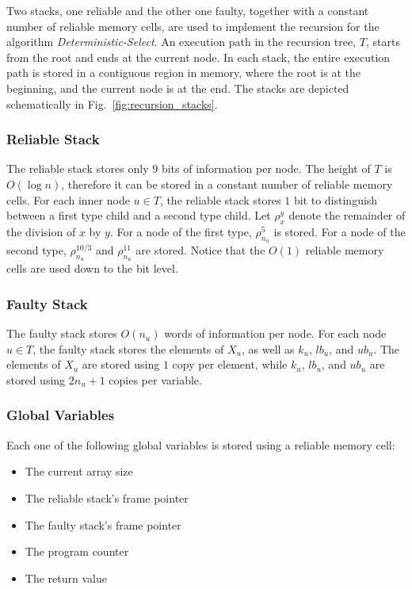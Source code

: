 \documentclass{llncs}
\begin{document}
Two stacks, one reliable and the other one faulty, together with a constant number of reliable memory cells, are used to implement the recursion for the algorithm \emph{Deterministic-Select}. An execution path in the recursion tree, $T$, starts from the root and ends at the current node. In each stack, the entire execution path is stored in a contiguous region in memory, where the root is at the beginning, and the current node is at the end. The stacks are depicted schematically in Fig.~\ref{fig:recursion_stacks}.

\subsubsection{Reliable Stack}

The reliable stack stores only $9$ bits of information per node. The height of $T$ is $O(\log n)$, therefore it can be stored in a constant number of reliable memory cells. For each inner node $u \in T$, the reliable stack stores $1$ bit to distinguish between a first type child and a second type child. Let $\rho_x^y$ denote the remainder of the division of $x$ by $y$. For a node of the first type, $\rho^5_{n_u}$ is stored. For a node of the second type, $\rho^{10/3}_{n_u}$ and $\rho^{11}_{n_u}$ are stored. Notice that the $O(1)$ reliable memory cells are used down to the bit level.

\subsubsection{Faulty Stack}

The faulty stack stores $O(n_u)$ words of information per node. For each node $u \in T$, the faulty stack stores the elements of $X_u$, as well as $k_u$, $lb_u$, and $ub_u$. The elements of $X_u$ are stored using $1$ copy per element, while $k_u$, $lb_u$, and $ub_u$ are stored using $2n_u + 1$ copies per variable.

\subsubsection{Global Variables}

Each one of the following global variables is stored using a reliable memory cell:

\begin{itemize}
	\item The current array size
	\item The reliable stack's frame pointer
	\item The faulty stack's frame pointer
	\item The program counter
	\item The return value
\end{itemize}
\end{document}
